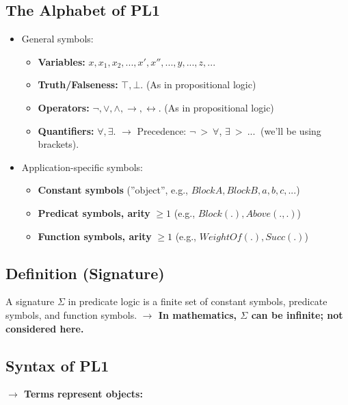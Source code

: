 \documentclass[conference]{styles/acmsiggraph}
\begin{document}
    \subsection{The Alphabet of PL1}
        \begin{itemize}
            \item General symbols:
                \begin{itemize}
                    \item \textbf{Variables:} $x,x_1,x_2,...,x',x'',...,y,...,z,...$
                    \item \textbf{Truth/Falseness:} $\top,\bot$. (As in propositional logic)
                    \item \textbf{Operators:} $\lnot,\vee,\wedge,\rightarrow,\leftrightarrow$. (As in propositional logic)
                    \item \textbf{Quantifiers:} $\forall,\exists$.\newline
                        $\rightarrow$ Precedence: $\lnot \  > \  \forall$, $\exists \  > \  ... \ $ (we'll be using brackets).
                \end{itemize}
            \item Application-specific symbols:
                \begin{itemize}
                    \item \textbf{Constant symbols} (''object'', e.g., $BlockA,BlockB,a,b,c,...$)
                    \item \textbf{Predicat symbols, arity} $\geq 1$ (e.g., $Block(.),Above(.,.)$)
                    \item \textbf{Function symbols, arity} $\geq 1$ (e.g., $WeightOf(.),Succ(.)$)
                \end{itemize}
        \end{itemize}
    
    
    \subsection{Definition (Signature)}
        A signature $\Sigma$ in predicate logic is a finite set of constant symbols, predicate symbols, and function symbols.\newline
        \textbf{$\rightarrow$ In mathematics, $\Sigma$ can be infinite; not considered here.}
    
    
    \subsection{Syntax of PL1}
        \textbf{$\rightarrow$ Terms represent objects:}
\end{document}
